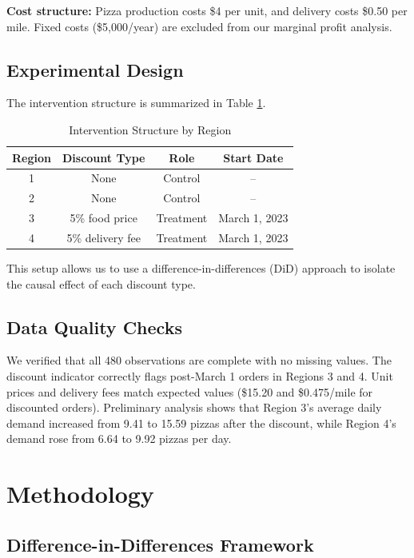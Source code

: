 \documentclass[12pt]{article}
\begin{document}
\textbf{Cost structure:} Pizza production costs \$4 per unit, and delivery costs \$0.50 per mile. Fixed costs (\$5,000/year) are excluded from our marginal profit analysis.

\subsection{Experimental Design}

The intervention structure is summarized in Table \ref{tab:intervention}.

\begin{table}[H]
\centering
\caption{Intervention Structure by Region}
\label{tab:intervention}
\begin{tabular}{cccc}
\toprule
\textbf{Region} & \textbf{Discount Type} & \textbf{Role} & \textbf{Start Date} \\
\midrule
1 & None & Control & -- \\
2 & None & Control & -- \\
3 & 5\% food price & Treatment & March 1, 2023 \\
4 & 5\% delivery fee & Treatment & March 1, 2023 \\
\bottomrule
\end{tabular}
\end{table}

This setup allows us to use a difference-in-differences (DiD) approach to isolate the causal effect of each discount type.

\subsection{Data Quality Checks}

We verified that all 480 observations are complete with no missing values. The discount indicator correctly flags post-March 1 orders in Regions 3 and 4. Unit prices and delivery fees match expected values (\$15.20 and \$0.475/mile for discounted orders). Preliminary analysis shows that Region 3's average daily demand increased from 9.41 to 15.59 pizzas after the discount, while Region 4's demand rose from 6.64 to 9.92 pizzas per day.

\section{Methodology}

\subsection{Difference-in-Differences Framework}
\end{document}
